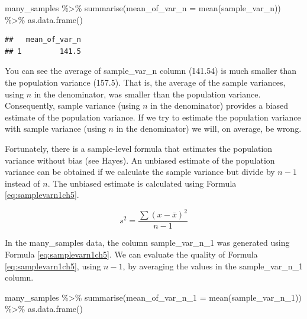 \documentclass[
]{krantz}
\makeatletter
\newenvironment{Shaded}{\begin{snugshade}}{\end{snugshade}}
\newcommand{\AttributeTok}[1]{\textcolor[rgb]{0.61,0.61,0.61}{#1}}
\newcommand{\FunctionTok}[1]{\textcolor[rgb]{0,0,0}{#1}}
\newcommand{\NormalTok}[1]{#1}
\newcommand{\SpecialCharTok}[1]{\textcolor[rgb]{0,0,0}{#1}}
\newenvironment{kframe}{%
\medskip{}
\setlength{\fboxsep}{.8em}
 \def\at@end@of@kframe{}%
 \ifinner\ifhmode%
  \def\at@end@of@kframe{\end{minipage}}%
  \begin{minipage}{\columnwidth}%
 \fi\fi%
 \def\FrameCommand##1{\hskip\@totalleftmargin \hskip-\fboxsep
 \colorbox{shadecolor}{##1}\hskip-\fboxsep
     \hskip-\linewidth \hskip-\@totalleftmargin \hskip\columnwidth}%
 \MakeFramed {\advance\hsize-\width
   \@totalleftmargin\z@ \linewidth\hsize
   \@setminipage}}%
 {\par\unskip\endMakeFramed%
 \at@end@of@kframe}
\renewenvironment{Shaded}{\begin{kframe}}{\end{kframe}}
\makeatother
\begin{document}
\begin{Shaded}
\begin{Highlighting}[]
\NormalTok{many\_samples }\SpecialCharTok{\%\textgreater{}\%}
  \FunctionTok{summarise}\NormalTok{(}\AttributeTok{mean\_of\_var\_n =} \FunctionTok{mean}\NormalTok{(sample\_var\_n)) }\SpecialCharTok{\%\textgreater{}\%}
  \FunctionTok{as.data.frame}\NormalTok{()}
\end{Highlighting}
\end{Shaded}

\begin{verbatim}
##   mean_of_var_n
## 1         141.5
\end{verbatim}

You can see the average of sample\_var\_n column (141.54) is much smaller than the population variance (157.5). That is, the average of the sample variances, using \(n\) in the denominator, was smaller than the population variance. Consequently, sample variance (using \(n\) in the denominator) provides a biased estimate of the population variance. If we try to estimate the population variance with sample variance (using \(n\) in the denominator) we will, on average, be wrong.

Fortunately, there is a sample-level formula that estimates the population variance without bias (see Hayes). An unbiased estimate of the population variance can be obtained if we calculate the sample variance but divide by \(n - 1\) instead of \(n\). The unbiased estimate is calculated using Formula \eqref{eq:samplevarn1ch5}.

\begin{equation} 
s^2 = \frac{\sum{(x - \bar{x})^2}}{n-1}
      \label{eq:samplevarn1ch5}
\end{equation}

In the many\_samples data, the column sample\_var\_n\_1 was generated using Formula \eqref{eq:samplevarn1ch5}. We can evaluate the quality of Formula \eqref{eq:samplevarn1ch5}, using \(n-1\), by averaging the values in the sample\_var\_n\_1 column.

\begin{Shaded}
\begin{Highlighting}[]
\NormalTok{many\_samples }\SpecialCharTok{\%\textgreater{}\%}
  \FunctionTok{summarise}\NormalTok{(}\AttributeTok{mean\_of\_var\_n\_1 =} \FunctionTok{mean}\NormalTok{(sample\_var\_n\_1)) }\SpecialCharTok{\%\textgreater{}\%}
  \FunctionTok{as.data.frame}\NormalTok{()}
\end{Highlighting}
\end{Shaded}
\end{document}
